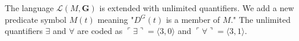 The language $\mathcal{L}(M, \mathbf{G})$ is extended with unlimited quantifiers. We add a new predicate symbol $M(t)$ meaning "$D^G(t)$ is a member of $M$." The unlimited quantifiers $\exists$ and $\forall$ are coded as $\ulcorner \exists \urcorner = \langle 3, 0 \rangle$ and $\ulcorner \forall \urcorner = \langle 3, 1 \rangle$.
